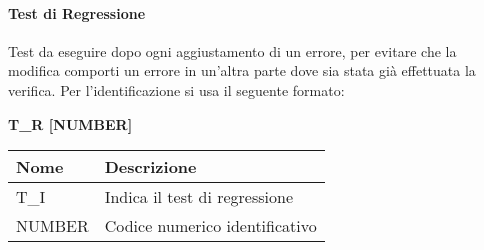 \paragraph{Test di Regressione}  \hfill \break
Test da eseguire dopo ogni aggiustamento di un errore, per evitare che la modifica comporti un errore in 
un’altra parte dove sia stata già effettuata la verifica.\newline
Per l’identificazione si usa il seguente formato:
\begin{center}
    \textbf{T\_R [NUMBER]}
\end{center}
\renewcommand{\arraystretch}{1.8} 
 \begin{tabular}{ |m{7em}|m{30em}| }
        \hline
        \textbf{Nome} & \textbf{Descrizione} \\
        \hline
            T\_I & Indica il test di regressione \\
        \hline
            NUMBER & Codice numerico identificativo \\
        \hline
 \end{tabular}